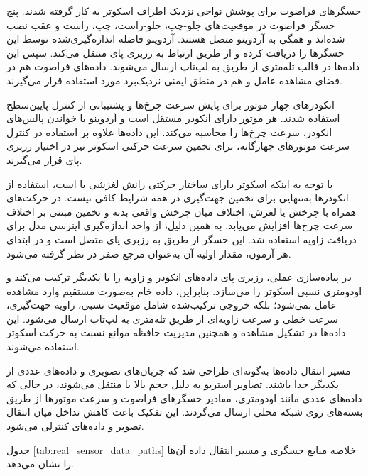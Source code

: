 حسگرهای فراصوت  برای پوشش نواحی نزدیک اطراف اسکوتر به کار گرفته شدند. پنج حسگر فراصوت در موقعیت‌های جلو-چپ، جلو-راست، چپ، راست و عقب نصب شده‌اند و همگی به آردوینو متصل هستند. آردوینو فاصله اندازه‌گیری‌شده توسط این حسگرها را دریافت کرده و از طریق ارتباط  به رزبری پای منتقل می‌کند. سپس این داده‌ها در قالب تله‌متری از طریق  به لپ‌تاپ ارسال می‌شوند. داده‌های فراصوت هم در فضای مشاهده عامل و هم در منطق ایمنی نزدیک‌برد مورد استفاده قرار می‌گیرند.

انکودرهای چهار موتور برای پایش سرعت چرخ‌ها و پشتیبانی از کنترل پایین‌سطح استفاده شدند. هر موتور دارای انکودر مستقل است و آردوینو با خواندن پالس‌های انکودر، سرعت چرخ‌ها را محاسبه می‌کند. این داده‌ها علاوه بر استفاده در کنترل سرعت موتورهای چهارگانه، برای تخمین سرعت حرکتی اسکوتر نیز در اختیار رزبری پای قرار می‌گیرند.

با توجه به اینکه اسکوتر دارای ساختار حرکتی رانش لغزشی یا  است، استفاده از انکودرها به‌تنهایی برای تخمین جهت‌گیری در همه شرایط کافی نیست. در حرکت‌های همراه با چرخش یا لغزش، اختلاف میان چرخش واقعی بدنه و تخمین مبتنی بر اختلاف سرعت چرخ‌ها افزایش می‌یابد. به همین دلیل، از واحد اندازه‌گیری اینرسی مدل  برای دریافت زاویه  استفاده شد. این حسگر از طریق  به رزبری پای متصل است و در ابتدای هر آزمون، مقدار اولیه  آن به‌عنوان مرجع صفر در نظر گرفته می‌شود.

در پیاده‌سازی عملی، رزبری پای داده‌های انکودر و زاویه  را با یکدیگر ترکیب می‌کند و اودومتری نسبی اسکوتر را می‌سازد. بنابراین، داده خام  به‌صورت مستقیم وارد مشاهده عامل نمی‌شود؛ بلکه خروجی ترکیب‌شده شامل موقعیت نسبی، زاویه جهت‌گیری، سرعت خطی و سرعت زاویه‌ای از طریق تله‌متری  به لپ‌تاپ ارسال می‌شود. این داده‌ها در تشکیل مشاهده و همچنین مدیریت حافظه موانع نسبت به حرکت اسکوتر استفاده می‌شوند.

مسیر انتقال داده‌ها به‌گونه‌ای طراحی شد که جریان‌های تصویری و داده‌های عددی از یکدیگر جدا باشند. تصاویر استریو به دلیل حجم بالا با  منتقل می‌شوند، در حالی که داده‌های عددی مانند اودومتری، مقادیر حسگرهای فراصوت و سرعت موتورها از طریق بسته‌های  روی شبکه محلی ارسال می‌گردند. این تفکیک باعث کاهش تداخل میان انتقال تصویر و داده‌های کنترلی می‌شود.

جدول \ref{tab:real_sensor_data_paths} خلاصه منابع حسگری و مسیر انتقال داده آن‌ها را نشان می‌دهد.

